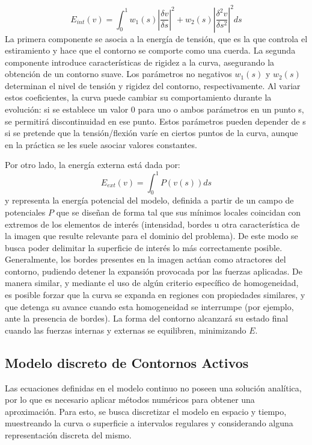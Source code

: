 %
\begin{equation}
E_{int}(v) = \int_{0}^{1} w_{1}(s) \left| \dfrac{\delta v}{\delta s} \right|^{2} + w_{2}(s) \left|\dfrac{\delta^{2}v}{\delta s^2} \right|^{2} ds
\end{equation}
%
La primera componente se asocia a la energía de tensión, que es la que controla el estiramiento y hace que el contorno se comporte como una cuerda. La segunda componente introduce características de rigidez a la curva, asegurando la obtención de un contorno suave. Los parámetros no negativos $w_{1}(s)$ y $w_{2}(s)$ determinan el nivel de tensión y rigidez del contorno, respectivamente. Al variar estos coeficientes, la curva puede cambiar su comportamiento durante la evolución: si se establece un valor 0 para uno o ambos parámetros en un punto s, se permitirá discontinuidad en ese punto. Estos parámetros pueden depender de s si se pretende que la tensión/flexión varíe en ciertos puntos de la curva, aunque en la práctica se les suele asociar valores constantes.

Por otro lado, la energía externa está dada por:
%
\begin{equation}
	E_{ext}(v) = \int_{0}^{1} P(v(s))ds
\end{equation}
%
y representa la energía potencial del modelo, definida a partir de un campo de potenciales $P$ que se diseñan de forma tal que sus mínimos locales coincidan con extremos de los elementos de interés (intensidad, bordes u otra característica de la imagen que resulte relevante para el dominio del problema). De este modo se busca poder delimitar la superficie de interés lo más correctamente posible. Generalmente, los bordes presentes en la imagen actúan como atractores del contorno, pudiendo detener la expansión provocada por las fuerzas aplicadas. De manera similar, y mediante el uso de algún criterio específico de homogeneidad, es posible forzar que la curva se expanda en regiones con propiedades similares, y que detenga su avance cuando esta homogeneidad se interrumpe (por ejemplo, ante la presencia de bordes).
La forma del contorno alcanzará su estado final cuando las fuerzas internas y externas se equilibren, minimizando $E$.

\subsection{Modelo discreto de Contornos Activos}\label{section:modelo_discreto_contornos_activos}
Las ecuaciones definidas en el modelo continuo no poseen una solución analítica, por lo que es necesario aplicar métodos numéricos para obtener una aproximación. Para esto, se busca discretizar el modelo en espacio y tiempo, muestreando la curva o superficie a intervalos regulares y considerando alguna representación discreta del mismo.

